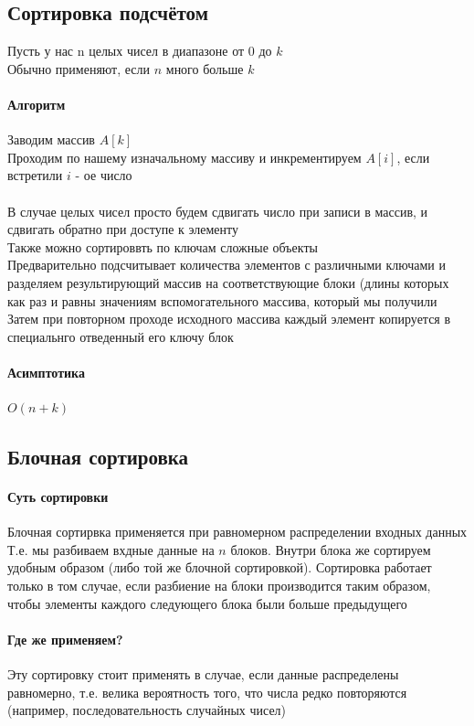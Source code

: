 \documentclass[a4paper,10pt]{article}
\begin{document}
	\subsection{Сортировка подсчётом}
	Пусть у нас n целых чисел в диапазоне от $0$ до $k$ \\
	Обычно применяют, если $n$ много больше $k$ \\
	\paragraph{Алгоритм}
	Заводим массив $A[k]$ \\
	Проходим по нашему изначальному массиву и инкрементируем $A[i]$, если встретили $i$ - ое число \\
	\\ В случае целых чисел просто будем сдвигать число при записи в массив, и сдвигать обратно при доступе к элементу \\
	Также можно сортироввть по ключам сложные объекты \\
	Предварительно подсчитывает количества элементов с различными ключами и разделяем результирующий массив на соответствующие блоки (длины которых как раз и равны значениям вспомогательного массива, который мы получили \\
	Затем при повторном проходе исходного массива каждый элемент копируется в специальнго отведенный его ключу блок \\
	\paragraph{Асимптотика}
	$O(n+k)$
	\subsection{Блочная сортировка}
	\paragraph{Суть сортировки}
	Блочная сортирвка применяется при равномерном распределении входных данных \\
	Т.е. мы разбиваем вхдные данные на $n$ блоков. Внутри блока же сортируем удобным образом (либо той же блочной сортировкой). Сортировка работает только в том случае, если разбиение на блоки производится таким образом, чтобы элементы каждого следующего блока были больше предыдущего
	\paragraph{Где же применяем?}
	Эту сортировку стоит применять в случае, если данные распределены равномерно, т.е. велика вероятность того, что числа редко повторяются (например, последовательность случайных чисел) \\
\end{document}
